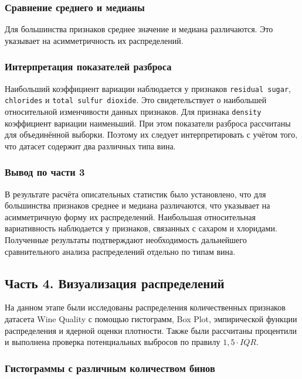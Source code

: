 \subsubsection*{Сравнение среднего и медианы}
 
Для большинства признаков среднее значение и медиана различаются. Это указывает на асимметричность их распределений.
 
\subsubsection*{Интерпретация показателей разброса}
 

Наибольший коэффициент вариации наблюдается у признаков \texttt{residual sugar}, \texttt{chlorides} и \texttt{total sulfur dioxide}. Это свидетельствует о наибольшей относительной изменчивости данных признаков. Для признака \texttt{density} коэффициент вариации наименьший. При этом показатели разброса рассчитаны для объединённой выборки. Поэтому их следует интерпретировать с учётом того, что датасет содержит два различных типа вина.

\subsubsection*{Вывод по части 3}
 
В результате расчёта описательных статистик было установлено, что для большинства признаков среднее и медиана различаются, что указывает на асимметричную форму их распределений. Наибольшая относительная вариативность наблюдается у признаков, связанных с сахаром и хлоридами. Полученные результаты подтверждают необходимость дальнейшего сравнительного анализа распределений отдельно по типам вина.
 
\subsection*{\textbf{Часть 4. Визуализация распределений}}
 
На данном этапе были исследованы распределения количественных признаков
датасета Wine Quality с помощью гистограмм, Box Plot, эмпирической функции
распределения и ядерной оценки плотности. Также были рассчитаны
процентили и выполнена проверка потенциальных выбросов по правилу
$1{,}5 \cdot IQR$.
 
\subsubsection*{Гистограммы с различным количеством бинов}
 
